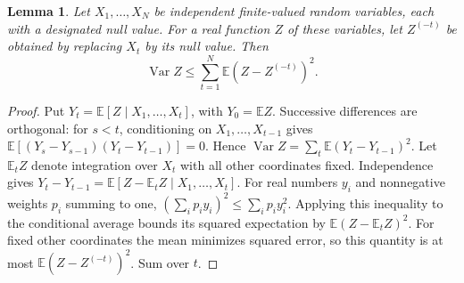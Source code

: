 \documentclass[11pt]{article}
\numberwithin{equation}{section}
\newtheorem{lemma}[theorem]{Lemma}
\theoremstyle{definition}
\newcommand{\E}{\mathbb E}
\newcommand{\Var}{\operatorname{Var}}
\begin{document}
\begin{lemma}\label{lem:deletion-variance}
Let $X_1,\ldots,X_N$ be independent finite-valued random variables,
each with a designated null value. For a real function $Z$ of these
variables, let $Z^{(-t)}$ be obtained by replacing $X_t$ by its null
value. Then
\[
 \Var Z\le\sum_{t=1}^N\E(Z-Z^{(-t)})^2.
\]
\end{lemma}
\begin{proof}
Put $Y_t=\E[Z\mid X_1,\ldots,X_t]$, with $Y_0=\E Z$.
Successive differences are orthogonal: for $s<t$, conditioning on
$X_1,\ldots,X_{t-1}$ gives
$\E[(Y_s-Y_{s-1})(Y_t-Y_{t-1})]=0$.
Hence $\Var Z=\sum_t\E(Y_t-Y_{t-1})^2$.
Let $\E_tZ$ denote integration over $X_t$ with all other coordinates
fixed. Independence gives
$Y_t-Y_{t-1}=\E[Z-\E_tZ\mid X_1,\ldots,X_t]$.
For real numbers $y_i$ and nonnegative weights $p_i$ summing to one,
$(\sum_i p_iy_i)^2\le\sum_i p_iy_i^2$. Applying this inequality
to the conditional average bounds its squared expectation by
$\E(Z-\E_tZ)^2$.
For fixed other coordinates the mean minimizes squared error, so this
quantity is at most $\E(Z-Z^{(-t)})^2$. Sum over $t$.
\end{proof}
\end{document}
